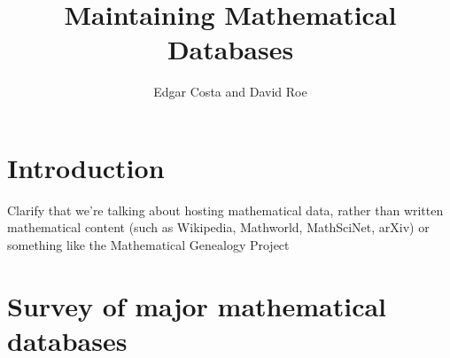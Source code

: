\documentclass{article}
\title{Maintaining Mathematical Databases}
\author{Edgar Costa and David Roe}
\begin{document}
\maketitle

\section{Introduction}

Clarify that we're talking about hosting mathematical data, rather than written mathematical content (such as Wikipedia, Mathworld, MathSciNet, arXiv) or something like the Mathematical Genealogy Project

\section{Survey of major mathematical databases}
\end{document}
